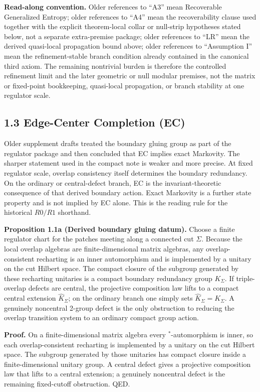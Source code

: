 \textbf{Read-along convention.} Older references to ``A3'' mean Recoverable Generalized Entropy; older references to ``A4'' mean the recoverability clause used together with the explicit theorem-local collar or null-strip hypotheses stated below, not a separate extra-premise package; older references to ``LR'' mean the derived quasi-local propagation bound above; older references to ``Assumption I'' mean the refinement-stable branch condition already contained in the canonical third axiom. The remaining nontrivial burden is therefore the controlled refinement limit and the later geometric or null modular premises, not the matrix or fixed-point bookkeeping, quasi-local propagation, or branch stability at one regulator scale.

\subsection{1.3 Edge-Center Completion (EC)}\label{13-edge-center-completion-ec}

Older supplement drafts treated the boundary gluing group as part of the regulator package and then concluded that EC implies exact Markovity. The sharper statement used in the compact note is weaker and more precise. At fixed regulator scale, overlap consistency itself determines the boundary redundancy. On the ordinary or central-defect branch, EC is the invariant-theoretic consequence of that derived boundary action. Exact Markovity is a further state property and is not implied by EC alone. This is the reading rule for the historical \(R0/R1\) shorthand.

\textbf{Proposition 1.1a (Derived boundary gluing datum).} Choose a finite regulator chart for the patches meeting along a connected cut \(\Sigma\). Because the local overlap algebras are finite-dimensional matrix algebras, any overlap-consistent recharting is an inner automorphism and is implemented by a unitary on the cut Hilbert space. The compact closure of the subgroup generated by these recharting unitaries is a compact boundary redundancy group \(K_\Sigma\). If triple-overlap defects are central, the projective composition law lifts to a compact central extension \(\widehat K_\Sigma\); on the ordinary branch one simply sets \(\widehat K_\Sigma = K_\Sigma\). A genuinely noncentral 2-group defect is the only obstruction to reducing the overlap transition system to an ordinary compact group action.

\textbf{Proof.} On a finite-dimensional matrix algebra every \(^*\)-automorphism is inner, so each overlap-consistent recharting is implemented by a unitary on the cut Hilbert space. The subgroup generated by those unitaries has compact closure inside a finite-dimensional unitary group. A central defect gives a projective composition law that lifts to a central extension; a genuinely noncentral defect is the remaining fixed-cutoff obstruction. QED.

